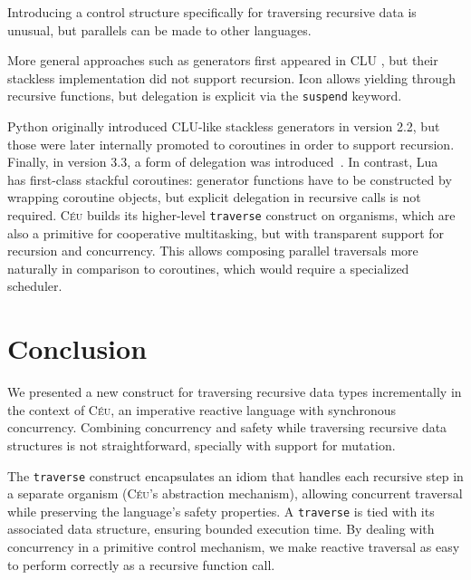 \documentclass{sig-alternate}
\newcommand{\CEU}{\textsc{C\'{e}u}\xspace}
\newcommand{\code}[1] {{\small{\texttt{#1}}}}
\begin{document}
Introducing a control structure specifically for traversing recursive data is
unusual, but parallels can be made to other languages.

More general approaches such as generators first appeared in CLU \cite{clu}, 
but their stackless implementation did not support recursion.
%
Icon \cite{icon} allows yielding through recursive functions, but delegation is 
explicit via the \code{suspend} keyword.
%

%
Python originally introduced CLU-like stackless generators in version 2.2,
but those were later internally promoted to coroutines in order to support
recursion. Finally, in version 3.3, a form of delegation was
introduced~\cite{peps}.
%
In contrast, Lua~\cite{lua} has first-class stackful coroutines:
generator functions have to be constructed by wrapping coroutine objects, but 
explicit delegation in recursive calls is not required.
%
\CEU builds its higher-level \code{traverse} construct on organisms, which are 
also a primitive for cooperative multitasking, but with transparent support for 
recursion and concurrency.
This allows composing parallel traversals more naturally in comparison to 
coroutines, which would require a specialized scheduler.

\section{Conclusion}
\label{sec.conclusion}

We presented a new construct for traversing recursive data types
incrementally in the context of \CEU, an imperative reactive language with
synchronous concurrency.
Combining concurrency and safety while traversing recursive data structures is 
not straightforward, specially with support for mutation.

The \code{traverse} construct encapsulates an idiom that handles each recursive 
step in a separate organism (\CEU's abstraction mechanism), allowing concurrent 
traversal while preserving the language's safety properties.
A \code{traverse} is tied with its associated data structure, ensuring bounded 
execution time. %
By dealing with concurrency in a primitive control mechanism, we make reactive 
traversal as easy to perform correctly as a recursive function call.
\end{document}
